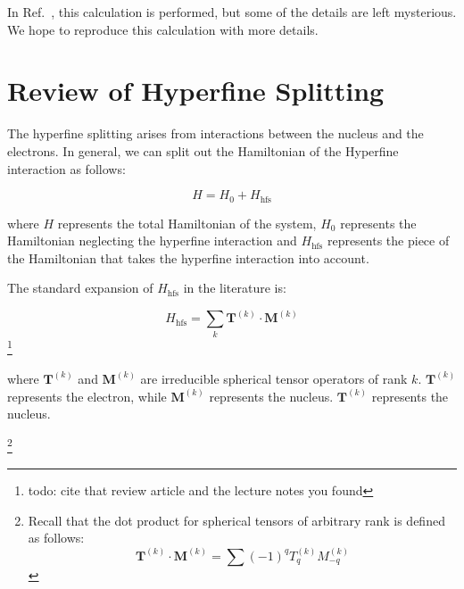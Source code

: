 In Ref.\ \cite{cjeDiss}, this calculation is performed, but some of the details are left mysterious. We hope to reproduce this calculation with more details.  

\section{Review of Hyperfine Splitting}

The hyperfine splitting arises from interactions between the nucleus and the electrons. In general, we can split out the Hamiltonian of the Hyperfine interaction as follows: 

\begin{equation}
H=H_0+H_{\mathrm{hfs}}
\end{equation}

where $H$ represents the total Hamiltonian of the system, $H_0$ represents the Hamiltonian neglecting the hyperfine interaction and $H_{\mathrm{hfs}}$ represents the piece of the Hamiltonian that takes the hyperfine interaction into account. 

The standard expansion of $H_{\mathrm{hfs}}$ in the literature is:  

\begin{equation}
H_{\mathrm{hfs}}=\sum_k \mathbf{T}^{(k)} \cdot \mathbf{M}^{(k)} \label{hfs_hamiltonian_eqn}
\end{equation}
\cite{schwartz_hyperfine_expansion}
\cite{experimental_hyperfine_alkali_arimondo}
\cite{chinesePhysics}
\footnote{todo: cite that review article and the lecture notes you found}

where $\mathbf{T}^{(k)}$ and $\mathbf{M}^{(k)}$ are irreducible spherical tensor operators of rank $k$. $\mathbf{T}^{(k)}$ represents the electron, while $\mathbf{M}^{(k)}$ represents the nucleus. $\mathbf{T}^{(k)}$ represents the nucleus.

\footnote{Recall that the dot product for spherical tensors of arbitrary rank is defined as follows:
\begin{equation}
\mathbf{T}^{(k)}\cdot\mathbf{M}^{(k)}=\sum (-1)^qT_q^{(k)}M_{-q}^{(k)}
\end{equation}
}

